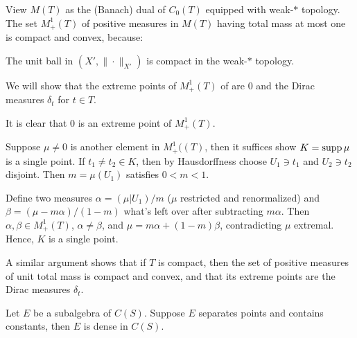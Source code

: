 View $M(T)$ as the (Banach) dual of $C_0(T)$ equipped with weak-$\ast$
topology.
The set $M_+^1(T)$ of positive measures in $M(T)$ having total mass at most one
is compact and convex, because:

\begin{theorem}
  The unit ball in $(X', \|\cdot\|_{X'})$ is compact
  in the weak-$\ast$ topology.
\end{theorem}

We will show that the extreme points of $M_+^1(T)$ of are $0$ and the
Dirac measures $\delta_t$ for $t \in T$.

It is clear that $0$ is an extreme point of $M_+^1(T)$.

Suppose $\mu \neq 0$ is another element in $M_+^1((T)$, then it suffices
show $K = \operatorname{supp} \mu$ is a single point. If $t_1 \neq t_2 \in K$, then
by Hausdorffness choose $U_1 \ni t_1$ and $U_2 \ni t_2$ disjoint.
Then $m = \mu(U_1)$ satisfies $0 < m < 1$.

Define two measures $\alpha = (\mu \vert U_1) / m$ ($\mu$ restricted and renormalized)
and $\beta = (\mu - m \alpha) / (1 - m)$ what's left over after subtracting $m \alpha$.
Then $\alpha, \beta \in M_+^1(T)$, $\alpha \neq \beta$, and $\mu = m \alpha + (1 - m) \beta$,
contradicting $\mu$ extremal. Hence, $K$ is a single point.

A similar argument shows that if $T$ is compact, then the set of positive
measures of unit total mass is compact and convex, and that its extreme points
are the Dirac measures $\delta_t$.

\begin{theorem}
  Let $E$ be a subalgebra of $C(S)$. Suppose
  $E$ separates points and contains constants, then $E$ is dense in $C(S)$.
\end{theorem}


